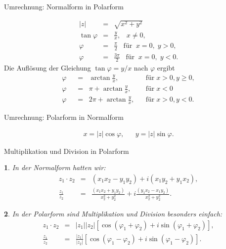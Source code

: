 \documentclass[german]{beamer}
\newcommand{\bq}{\begin{eqnarray*}}
\newcommand{\eq}{\end{eqnarray*}}
\newtheorem*{myemptytheorem}{}
\begin{document}
\begin{frame}{Umrechnung: Normalform in Polarform}

{\small
\bq
 \left| z \right| & = & \sqrt{x^2+y^2}
 \nonumber \\
 \tan \varphi & = & \frac{y}{x}, \;\;\; x\neq0,
 \nonumber \\
 \varphi & = & \frac{\pi}{2} \;\;\;\mbox{f\"ur} \;\; x=0, \; y>0,
 \nonumber \\
 \varphi & = & \frac{3\pi}{2} \;\;\;\mbox{f\"ur} \;\; x=0, \; y<0.
\eq
}
Die Aufl\"osung der Gleichung $\tan \varphi = y/x$ nach $\varphi$ ergibt
{\small
\begin{align*}
 \varphi \;\; & = \;\; \arctan \frac{y}{x}, && \mbox{f\"ur} \; x>0, y \ge 0, 
 \nonumber \\
 \varphi \;\; & = \;\; \pi + \arctan \frac{y}{x}, && \mbox{f\"ur} \; x<0 
 \nonumber \\
 \varphi \;\; & = \;\; 2\pi + \arctan \frac{y}{x}, && \mbox{f\"ur} \; x>0, y < 0.
\end{align*}
}

\end{frame}

\begin{frame}{Umrechnung: Polarform in Normalform}

\bq
 x = |z| \cos \varphi,
 & &
 y = |z| \sin \varphi.
\eq

\end{frame}

\begin{frame}{Multiplikation und Division in Polarform}

\begin{myemptytheorem}
In der Normalform hatten wir:
\bq
 z_1 \cdot z_2 & = & \left(x_1 x_2 - y_1 y_2 \right) + i \left(x_1 y_2 + y_1 x_2 \right),
 \nonumber \\
\frac{z_1}{z_2} & = &  
 \frac{\left(x_1 x_2 + y_1 y_2 \right)}{x_2^2+y_2^2}
 + 
 i \frac{\left(y_1 x_2 - x_1 y_2\right)}{x_2^2+y_2^2}.
\eq
\end{myemptytheorem}
\begin{myemptytheorem}
In der Polarform sind Multiplikation und Division besonders einfach:
\bq
 z_1 \cdot z_2 & = & \left| z_1 \right| \left| z_2 \right|
   \left[ \cos\left(\varphi_1+\varphi_2\right) + i \sin\left(\varphi_1+\varphi_2\right) \right],
 \nonumber \\
 \frac{z_1}{z_2} & = & \frac{\left| z_1 \right|}{\left| z_2 \right|}
   \left[ \cos\left(\varphi_1-\varphi_2\right) + i \sin\left(\varphi_1-\varphi_2\right) \right].
\eq
\end{myemptytheorem}

\end{frame}
\end{document}
